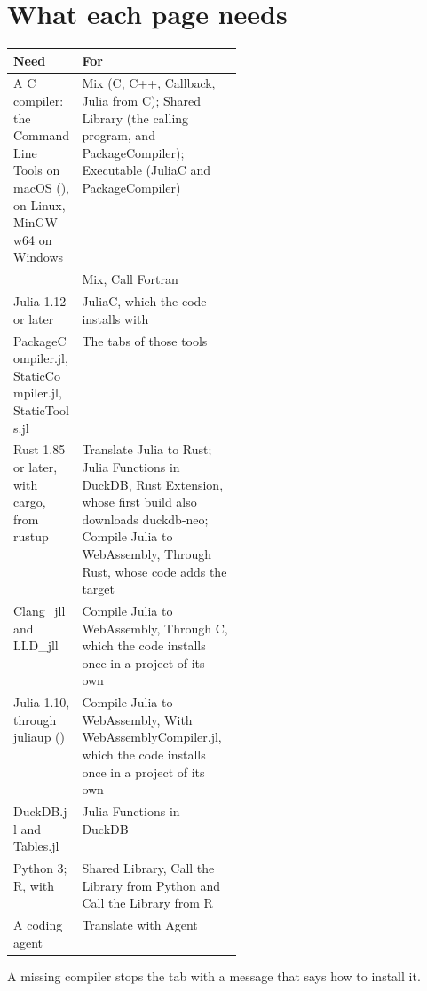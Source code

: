 \section{What each page needs}\label{sec:needs}
\begin{center}\small
\renewcommand{\arraystretch}{1.25}
\begin{tabularx}{\linewidth}{@{}p{0.3\linewidth}L@{}}
\toprule
\textbf{Need} & \textbf{For}\\
\midrule
A C compiler: the Command Line Tools on macOS (),  on Linux, MinGW-w64 on
  Windows & Mix (C, C++, Callback, Julia from C); Shared Library (the calling program, and PackageCompiler); Executable
  (JuliaC and PackageCompiler)\\
 & Mix, Call Fortran\\
Julia 1.12 or later & JuliaC, which the code installs with \\
PackageCompiler.jl, StaticCompiler.jl, StaticTools.jl & The tabs of those tools\\
Rust 1.85 or later, with cargo, from rustup & Translate Julia to Rust; Julia Functions in DuckDB, Rust Extension,
  whose first build also downloads duckdb-neo; Compile Julia to WebAssembly, Through Rust, whose code adds the target
  \\
Clang\_jll and LLD\_jll & Compile Julia to WebAssembly, Through C, which the code installs once in a project of
  its own\\
Julia 1.10, through juliaup () & Compile Julia to WebAssembly, With WebAssemblyCompiler.jl,
  which the code installs once in a project of its own\\
DuckDB.jl and Tables.jl & Julia Functions in DuckDB\\
Python 3; R, with  & Shared Library, Call the Library from Python and Call the Library from R\\
A coding agent & Translate with Agent\\
\bottomrule
\end{tabularx}
\end{center}
A missing compiler stops the tab with a message that says how to install it.

